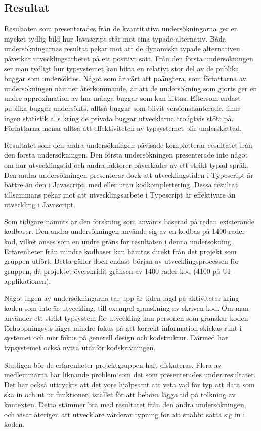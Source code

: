 \subsection{Resultat}
\label{subsec:alexander-discussion-results}

Resultaten som presenterades från de kvantitativa undersökningarna ger en mycket tydlig bild hur Javascript står mot sina typade alternativ. Båda undersökningarnas resultat pekar mot att de dynamiskt typade alternativen påverkar utvecklingsarbetet på ett positivt sätt. Från den första undersökningen ser man tydligt hur typsystemet kan hitta en relativt stor del av de publika buggar som undersöktes. Något som är värt att poängtera, som författarna av undersökningen nämner återkommande, är att de undersökning som gjorts ger en undre approximation av hur många buggar som kan hittas. Eftersom endast publika buggar undersökts, alltså buggar som blivit versionshanterade, finns ingen statistik alls kring de privata buggar utvecklarna troligtvis stött på. Författarna menar alltså att effektiviteten av typsystemet blir underskattad.

Resultatet som den andra undersökningen påvisade kompletterar resultatet från den första undersökningen.  Den första undersökningen presenterade inte något om hur utvecklingstid och andra faktorer påverkades av ett strikt typad språk. Den andra undersökningen presenterar dock att utvecklingstiden i Typescript är bättre än den i Javascript, med eller utan kodkomplettering. Dessa resultat tillsammans pekar mot att utvecklingsarbete i Typescript är effektivare än utveckling i Javascript. 

Som tidigare nämnts är den forskning som använts baserad på redan existerande kodbaser. Den andra undersökningen använde sig av en kodbas på 1400 rader kod, vilket anses som en undre gräns för resultaten i denna undersökning. Erfarenheter från mindre kodbaser kan hämtas direkt från det projekt som gruppen utfört. Detta gäller dock endast början av utvecklingsprocessen för gruppen, då projektet överskridit gränsen av 1400 rader kod (4100 på UI-applikationen\cite{current-ui-commit}).

Något ingen av undersökningarna tar upp är tiden lagd på aktiviteter kring koden som inte är utveckling, till exempel granskning av skriven kod. Om man använder ett strikt typsystem för utveckling kan personen som granskar koden förhoppningsvis lägga mindre fokus på att korrekt information skickas runt i systemet och mer fokus på generell design och kodstruktur. Därmed har typsystemet också nytta utanför kodskrivningen.

Slutligen bör de erfarenheter projektgruppen haft diskuteras. Flera av medlemmarna har liknande problem som det som presenterades under resultatet. Det har också uttryckts att det vore hjälpsamt att veta vad för typ att data som ska in och ut ur funktioner, istället för att behöva lägga tid på tolkning av kontexten. Detta stämmer bra med resultatet från den andra undersökningen, och visar återigen att utvecklare värderar typning för att snabbt sätta sig in i koden. 

\pagebreak